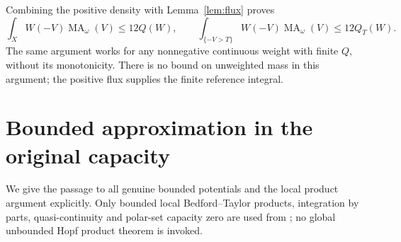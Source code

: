 \documentclass[11pt]{article}
\theoremstyle{remark}
\newcommand{\MA}{\operatorname{MA}}
\begin{document}
Combining the positive density with Lemma~\ref{lem:flux} proves
\begin{equation}\label{eq:smooth-upper}
 \int_XW(-V)\MA_\omega(V)\leq12Q(W),\qquad
 \int_{\{-V>T\}}W(-V)\MA_\omega(V)\leq12Q_T(W).
\end{equation}
The same argument works for any nonnegative continuous weight with finite
$Q$, without its monotonicity. There is no bound on unweighted mass in
this argument; the positive flux supplies the finite reference integral.

\section{Bounded approximation in the original capacity}
We give the passage to all genuine bounded potentials and the local
product argument explicitly. Only bounded local Bedford--Taylor products,
integration by parts, quasi-continuity and polar-set capacity zero are
used from \cite{BT}; no global unbounded Hopf product theorem is invoked.
\end{document}

